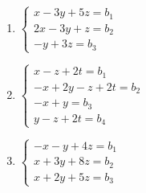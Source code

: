 \documentclass[12pt,reqno]{amsart}
\begin{document}
\begin{enumerate}
\begin{multicols}{3}
\begin{enumerate}

\item $\begin{cases}
 x - 3y + 5z = b_1\\
 2x-3y+z = b_2\\
 -y + 3z = b_3
\end{cases}$


\item $\begin{cases}
x-z+2t = b_1\\
-x+2y-z+2t = b_2\\
-x+y = b_3\\
y-z+2t=b_4
\end{cases}$


\item $\begin{cases}
 - x - y + 4 z = b_1\\
 x+3y+8z = b_2\\
 x + 2y + 5z = b_3
\end{cases}$


\end{enumerate}
\end{multicols}
\end{enumerate}
\end{document}
